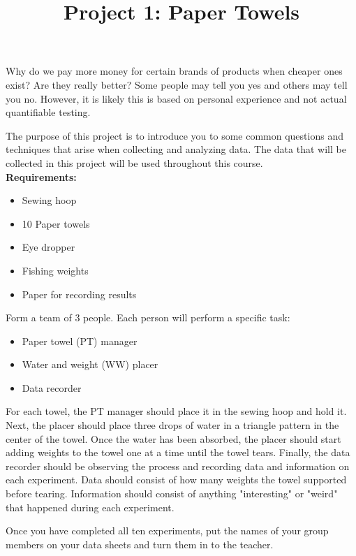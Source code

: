 \documentclass[12pt]{article}
\begin{document}
 
\title{Project 1: Paper Towels}
\date{}

\maketitle

Why do we pay more money for certain brands of products when cheaper ones exist? Are they really better? Some people may tell you yes and others may tell you no. However, it is likely this is based on personal experience and not actual quantifiable testing.

The purpose of this project is to introduce you to some common questions and techniques that arise when collecting and analyzing data. The data that will be collected in this project will be used throughout this course. \\

\noindent
\textbf{Requirements:}

\begin{itemize}
	\item Sewing hoop
	\item 10 Paper towels
	\item Eye dropper
	\item Fishing weights
	\item Paper for recording results
\end{itemize}

\noindent
Form a team of 3 people. Each person will perform a specific task:

\begin{itemize}
	\item{Paper towel (PT) manager}
	\item{Water and weight (WW) placer}
	\item{Data recorder}
\end{itemize}

For each towel, the PT manager should place it in the sewing hoop and hold it. Next, the placer should place three drops of water in a triangle pattern in the center of the towel. Once the water has been absorbed, the placer should start adding weights to the towel one at a time until the towel tears. Finally, the data recorder should be observing the process and recording data and information on each experiment. Data should consist of how many weights the towel supported before tearing. Information should consist of anything "interesting" or "weird" that happened during each experiment.

Once you have completed all ten experiments, put the names of your group members on your data sheets and turn them in to the teacher.
 
\end{document}
